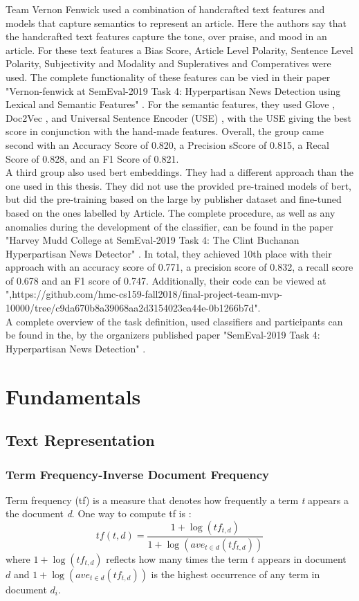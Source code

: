 \documentclass[a4paper, 11pt,titlepage,oneside,openany]{book}
\begin{document}
Team Vernon Fenwick used a combination of handcrafted text features and models that capture semantics to represent an article. Here the authors say that the handcrafted text features capture the tone, over praise, and mood in an article. For these text features a Bias Score, Article Level Polarity, Sentence Level Polarity, Subjectivity and Modality and Supleratives and Comperatives were used. The complete functionality of these features can be vied in their paper "Vernon-fenwick at SemEval-2019 Task 4: Hyperpartisan News Detection using Lexical and Semantic Features" \cite{vernon}. For the semantic features, they used Glove \cite{glove}, Doc2Vec \cite{doc2vec}, and Universal Sentence Encoder (USE) \cite{use}, with the USE giving the best score in conjunction with the hand-made features. Overall, the group came second with an Accuracy Score of 0.820, a Precision sScore of 0.815, a Recal Score of 0.828, and an F1 Score of 0.821. \\

\noindent A third group also used \gls{bert} embeddings. They had a different approach than the one used in this thesis. They did not use the provided pre-trained models of \gls{bert}, but did the pre-training based on the large by publisher dataset and fine-tuned based on the ones labelled by Article. The complete procedure, as well as any anomalies during the development of the classifier, can be found in the paper "Harvey Mudd College at SemEval-2019 Task 4: The Clint Buchanan Hyperpartisan News Detector" \cite{bertgruppe}. In total, they achieved 10th place with their approach with an accuracy score of 0.771, a precision score of 0.832, a recall score of 0.678 and an F1 score of 0.747. Additionally, their code can be viewed at ",https://github.com/hmc-cs159-fall2018/final-project-team-mvp-10000/tree/c9da670b8a39068aa2d3154023ea44e-0b1266b7d". \\
\noindent A complete overview of the task definition, used classifiers and participants can be found in the, by the organizers published paper "SemEval-2019 Task 4: Hyperpartisan News Detection" \cite{hyperpartisannewsdetection}.


\chapter{Fundamentals}
\section{Text Representation}
\subsection{Term Frequency-Inverse Document Frequency}
Term frequency (\gls{tf}) is a measure that denotes how frequently a term \textit{t} appears a the document \textit{d}. One way to compute \gls{tf} is \cite{IR-book}:\\
\[
tf(t,d)=\frac{1+\log(tf_{t,d})}{1+\log(ave_{t\in d}(tf_{t,d}))}
\]
where $1+\log(tf_{t,d})$ reflects how many times the term $t$ appears in document $d$ and $1+\log(ave_{t\in d}(tf_{t,d}))$ is the highest occurrence of any term in document $d_i$.\\
\end{document}
